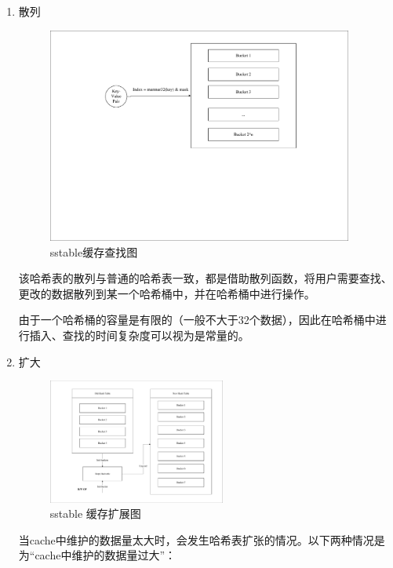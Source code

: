 \begin{enumerate}
			\begin{enumerate}
				\item 散列 
				
				\begin{figure}[H]
					\centering
					\includegraphics[width=0.95\textwidth]{pdf/cache_select.pdf}
					\caption{sstable缓存查找图}
					\label{sstable_cache_select}
				\end{figure}
				该哈希表的散列与普通的哈希表一致，都是借助散列函数，将用户需要查找、更改的数据散列到某一个哈希桶中，并在哈希桶中进行操作。

由于一个哈希桶的容量是有限的（一般不大于32个数据），因此在哈希桶中进行插入、查找的时间复杂度可以视为是常量的。

				
				\item 扩大
				
				\begin{figure}[H]
					\centering
					\includegraphics[width=0.55\textwidth]{pdf/cache_expend.pdf}
					\caption{sstable 缓存扩展图}
					\label{sstable_cache_expand}
				\end{figure}
				当cache中维护的数据量太大时，会发生哈希表扩张的情况。以下两种情况是为“cache中维护的数据量过大”：


\end{enumerate}
\end{enumerate}
